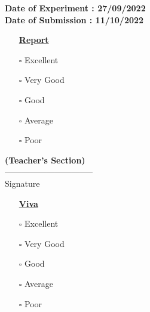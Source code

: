 \begin{titlepage}
\begin{center}
\textbf{Date of Experiment : 27/09/2022}\\
\textbf{Date of Submission : 11/10/2022}\\[1cm]



\vfill
\hrulefill
\vspace{-5mm}
\begin{multicols}{3}
\begin{itemize} [labelindent=3em,labelsep=0.5cm,leftmargin=*,noitemsep]
        \item[] \textbf{\underline{Report}}
        \item[$\square$] Excellent
        \item[$\square$] Very Good
        \item[$\square$] Good
        \item[$\square$] Average
        \item[$\square$] Poor
\end{itemize}
\columnbreak
\textbf{(Teacher's Section)}
\\[1.5cm]
--------------------------------
\\
Signature
\columnbreak
\begin{itemize}
[labelindent=6em,labelsep=0.5cm,leftmargin=*,noitemsep]
        \item[] \textbf{\underline{Viva}}
        \item[$\square$] Excellent
        \item[$\square$] Very Good
        \item[$\square$] Good
        \item[$\square$] Average
        \item[$\square$] Poor
\end{itemize}
\end{multicols}
\end{center}
\end{titlepage}
\newpage


\titleformat{\chapter}[display]
  {\normalfont\large\bfseries}{\chaptertitlename\ \thechapter}{0pt}{\large}
\titlespacing*{\chapter}{0pt}{-15pt}{10pt}


